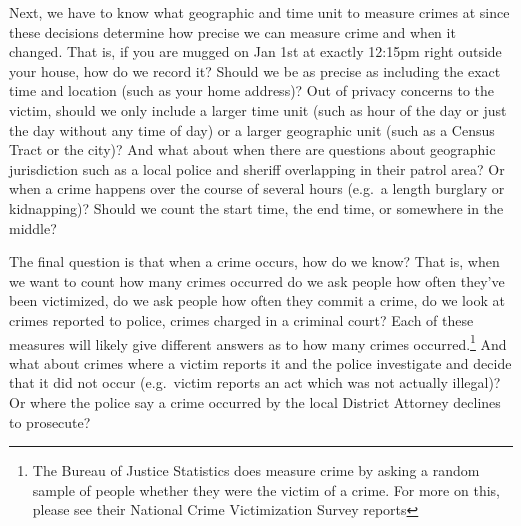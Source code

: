 \documentclass[
]{krantz}
\begin{document}
Next, we have to know what geographic and time unit to
measure crimes at since these decisions determine how
precise we can measure crime and when it changed. That is,
if you are mugged on Jan 1st at exactly 12:15pm right
outside your house, how do we record it? Should we be as
precise as including the exact time and location (such as
your home address)? Out of privacy concerns to the victim,
should we only include a larger time unit (such as hour of
the day or just the day without any time of day) or a larger
geographic unit (such as a Census Tract or the city)? And
what about when there are questions about geographic
jurisdiction such as a local police and sheriff overlapping
in their patrol area? Or when a crime happens over the
course of several hours (e.g.~a length burglary or
kidnapping)? Should we count the start time, the end time,
or somewhere in the middle?

The final question is that when a crime occurs, how do we
know? That is, when we want to count how many crimes
occurred do we ask people how often they've been victimized,
do we ask people how often they commit a crime, do we look
at crimes reported to police, crimes charged in a criminal
court? Each of these measures will likely give different
answers as to how many crimes
occurred.\footnote{The Bureau of Justice Statistics does measure crime by asking a random sample of people whether they were the victim of a crime. For more on this, please see their National Crime Victimization Survey reports}
And what about crimes where a victim reports it and the
police investigate and decide that it did not occur
(e.g.~victim reports an act which was not actually illegal)?
Or where the police say a crime occurred by the local
District Attorney declines to prosecute?
\end{document}

